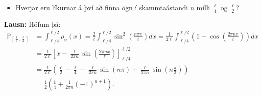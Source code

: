 \begin{itemize}
    \item Hverjar eru líkurnar á því að finna ögn í skammtaástandi $n$ milli $\frac{\ell}{4}$ og $\frac{\ell}{2}$?
\end{itemize}

\textbf{Lausn:} Höfum þá:
\begin{align*}
    \mathds{P}_{[\frac{\ell}{4},\frac{\ell}{2}]} &= \int_{\ell/4}^{\ell/2} \rho_n(x) = \frac{2}{\ell} \int_{\ell/4}^{\ell/2} \sin^2\left(\frac{n\pi x}{\ell} \right)dx = \frac{1}{2\ell} \int_{\ell/4}^{\ell/2} \left( 1 - \cos\left( \frac{2 \pi n x}{\ell} \right) \right)dx \\
    &= \frac{1}{2\ell} \left[ x - \frac{\ell}{2\pi n} \sin\left(\frac{2\pi n x}{\ell}\right) \right]_{\ell/4}^{\ell/2} \\
    &= \frac{1}{2\ell} \left( \frac{\ell}{2} - \frac{\ell}{4} - \frac{\ell}{2\pi n} \sin(n\pi ) + \frac{\ell}{2\pi n} \sin\left(n\frac{\pi}{2}\right) \right) \\
    &= \frac{1}{2}\left( \frac{1}{4} + \frac{1}{2\pi n}(-1)^{n+1} \right).
\end{align*}

